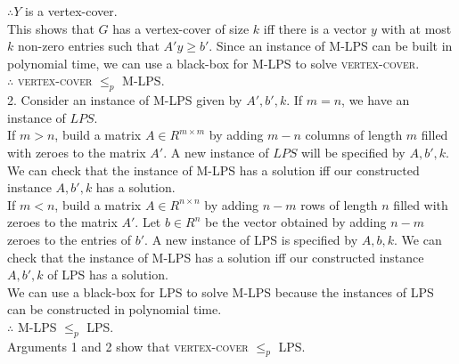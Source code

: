 \documentclass[10pt,letterpaper]{article}
\newcommand\tab[1][0.5cm]{\hspace*{#1}}
\begin{document}
\tab $\therefore Y$ is a vertex-cover.\\
This shows that $G$ has a vertex-cover of size $k$ iff there is a vector $y$ with at most $k$ non-zero entries such that $A'y\geq b'$. Since an instance of \textsc{M-LPS} can be built in polynomial time, we can use a black-box for \textsc{M-LPS} to solve \textsc{vertex-cover}.\\
$\therefore$ \textsc{vertex-cover} $\leq_p$ \textsc{M-LPS}.\\
2. Consider an instance of \textsc{M-LPS} given by $A',b',k$. If $m=n$, we have an instance of $LPS$.\\
\tab If $m>n$, build a matrix $A\in R^{m \times m}$ by adding $m-n$ columns of length $m$ filled with zeroes to the matrix $A'$. A new instance of $LPS$ will be specified by $A,b',k$. We can check that the instance of \textsc{M-LPS} has a solution iff our constructed instance $A,b',k$ has a solution.\\
\tab If $m<n$, build a matrix $A \in R^{n\times n}$ by adding $n-m$ rows of length $n$ filled with zeroes to the matrix $A'$. Let $b \in R^n$ be the vector obtained by adding $n-m$ zeroes to the entries of $b'$. A new instance of \textsc{LPS} is specified by $A,b,k$. We can check that the instance of \textsc{M-LPS} has a solution iff our constructed instance $A,b',k$ of \textsc{LPS} has a solution.\\
We can use a black-box for \textsc{LPS} to solve \textsc{M-LPS} because the instances of \textsc{LPS} can be constructed in polynomial time.\\
\tab $\therefore$ \textsc{M-LPS} $\leq_p$ \textsc{LPS}.\\
Arguments 1 and 2 show that \textsc{vertex-cover} $\leq_p$ \textsc{LPS}.

\pagebreak

\end{document}
